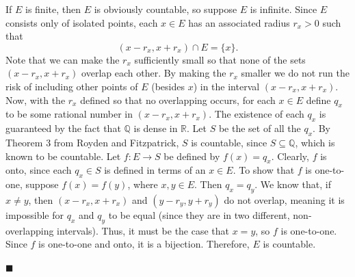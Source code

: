 \documentclass[12pt]{article}
\begin{document}
\noindent If $E$ is finite, then $E$ is obviously countable, so suppose $E$ is infinite. Since $E$ consists only of isolated points, each $x\in E$ has an associated radius $r_x>0$ such that $$(x-r_x,x+r_x)\cap E = \lbrace x \rbrace.$$ Note that we can make the $r_x$ sufficiently small so that none of the sets $(x-r_x, x+r_x)$ overlap each other. By making the $r_x$ smaller we do not run the risk of including other points of $E$ (besides $x$) in the interval $(x-r_x, x+r_x)$. Now, with the $r_x$ defined so that no overlapping occurs, for each $x\in E$ define $q_x$ to be some rational number in $(x-r_x, x+r_x)$. The existence of each $q_x$ is guaranteed by the fact that $\mathbb{Q}$ is dense in $\mathbb{R}$. Let $S$ be the set of all the $q_x$. By Theorem 3 from Royden and Fitzpatrick, $S$ is countable, since $S\subseteq\mathbb{Q}$, which is known to be countable. Let $f:E\longrightarrow S$ be defined by $f(x) = q_x$. Clearly, $f$ is onto, since each $q_x\in S$ is defined in terms of an $x\in E$. To show that $f$ is one-to-one, suppose $f(x)=f(y)$, where $x,y\in E$. Then $q_x=q_y$. We know that, if $x\neq y$, then $(x-r_x,x+r_x)$ and $(y-r_y, y+r_y)$ do not overlap, meaning it is impossible for $q_x$ and $q_y$ to be equal (since they are in two different, non-overlapping intervals). Thus, it must be the case that $x=y$, so $f$ is one-to-one. Since $f$ is one-to-one and onto, it is a bijection. Therefore, $E$ is countable.   

\hfill$\blacksquare$
\end{document}
